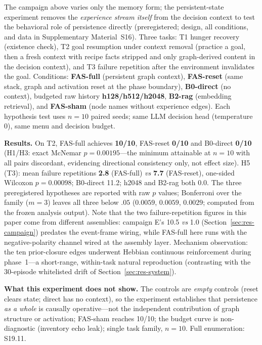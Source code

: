 \documentclass[10pt]{article}
\begin{document}
The campaign above varies only the memory form; the persistent-state
experiment removes the \emph{experience stream itself} from the
decision context to test the behavioral role of persistence directly
(preregistered; design, all conditions, and data in Supplementary
Material~S16). Three tasks: T1 hunger recovery (existence check), T2
goal resumption under context removal (practice a goal, then a fresh
context with recipe facts stripped and only graph-derived content in
the decision context), and T3 failure repetition after the environment
invalidates the goal. Conditions: \textbf{FAS-full} (persistent graph
context), \textbf{FAS-reset} (same stack, graph and activation reset at
the phase boundary), \textbf{B0-direct} (no context), budgeted raw
history \textbf{h128/h512/h2048}, \textbf{B2-rag} (embedding
retrieval), and \textbf{FAS-sham} (node names without experience
edges). Each hypothesis test uses $n{=}10$ paired seeds; same LLM
decision head (temperature 0), same menu and decision budget.

\textbf{Results.} On T2, FAS-full achieves \textbf{10/10}, FAS-reset
\textbf{0/10} and B0-direct \textbf{0/10} (H1/H3: exact McNemar
$p{=}0.00195$---the minimum attainable at $n{=}10$ with all pairs
discordant, evidencing directional consistency only, not effect size).
H5 (T3): mean failure repetitions \textbf{2.8} (FAS-full) \emph{vs}
\textbf{7.7} (FAS-reset), one-sided Wilcoxon $p{=}0.00098$;
B0-direct 11.2; h2048 and B2-rag both 0.0. The three preregistered
hypotheses are reported with raw $p$ values; Bonferroni over the
family ($m{=}3$) leaves all three below $.05$
($0.0059$, $0.0059$, $0.0029$; computed from the frozen analysis
output). Note that the two failure-repetition figures in this paper
come from different assemblies: campaign E's 10.5 \emph{vs} 1.0
(Section~\ref{sec:res-campaign}) predates the event-frame wiring, while
FAS-full here runs with the negative-polarity channel wired at the
assembly layer. Mechanism observation: the
ten prior-closure edges underwent Hebbian continuous reinforcement
during phase~1---a short-range, within-task natural reproduction
(contrasting with the 30-episode whitelisted drift of
Section~\ref{sec:res-system}).

\textbf{What this experiment does not show.} The controls are \emph{empty} controls (reset clears state; direct has no context), so the experiment establishes that persistence \emph{as a whole} is causally operative---not the independent contribution of graph structure or activation; FAS-sham reaches 10/10; the budget curve is non-diagnostic (inventory echo leak); single task family, $n{=}10$. Full enumeration: S19.11.
\end{document}
